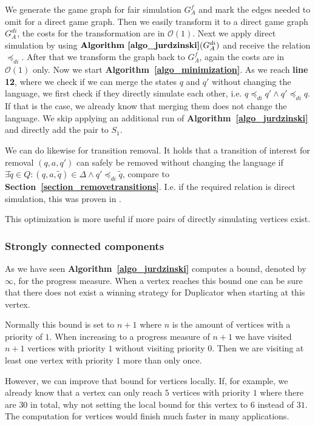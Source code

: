\documentclass[12pt,oneside,bibliography=totoc,abstracton]{scrartcl}
\newcommand{\sectionref}[1]{\textbf{Section~\ref{#1}}}
\newcommand{\algoref}[1]{\textbf{Algorithm~\ref{#1}}}
\newcommand{\libref}[1]{\textbf{\cite{#1}}}
\begin{document}
We generate the game graph for fair simulation $G^f_A$ and mark the edges needed to
omit for a direct game graph. Then we easily transform it to a direct game graph $G^{di}_A$,
the costs for the transformation are in $\mathcal{O}(1)$.
Next we apply direct simulation by using $\algoref{algo_jurdzinski}(G^{di}_A)$ and receive the relation $\preceq_{di}$.
After that we transform the graph back to $G^f_A$, again the costs are in $\mathcal{O}(1)$ only.
Now we start \algoref{algo_minimization}. As we reach \textbf{line 12}, where we check if
we can merge the states $q$ and $q'$ without changing the language, we first check if they directly simulate each other, i.e.
$q \preceq_{di} q' \land q' \preceq_{di} q$.
If that is the case, we already know that merging them does not change the language.
We skip applying an additional run of \algoref{algo_jurdzinski} and directly add the pair to $S_1$.

We can do likewise for transition removal. It holds that a transition of interest for removal $(q, a, q')$ can safely be
removed without changing the language if $\exists \tilde{q} \in Q : (q, a, \tilde{q}) \in \Delta \land q' \preceq_{di} \tilde{q}$,
compare to \sectionref{section_removetransitions}. I.e. if the required relation is direct simulation,
this was proven in \libref{fair_minimization}.

This optimization is more useful if more pairs of directly simulating vertices exist.

\subsubsection*{Strongly connected components}
As we have seen \algoref{algo_jurdzinski} computes a bound, denoted by $\infty$, for the progress measure.
When a vertex reaches this bound one can be sure that there does not exist a winning strategy for Duplicator
when starting at this vertex.

Normally this bound is set to $n + 1$ where $n$ is the amount of vertices with a priority of $1$. When increasing to a
progress measure of $n + 1$ we have visited $n + 1$ vertices with priority $1$ without visiting priority $0$.
Then we are visiting at least one vertex with priority $1$ more than only once.

However, we can improve that bound for vertices locally. If, for example, we already know that a vertex can only reach
$5$ vertices with priority $1$ where there are $30$ in total, why not setting the local bound for this vertex to $6$ instead of $31$.
The computation for vertices would finish much faster in many applications.
\end{document}
